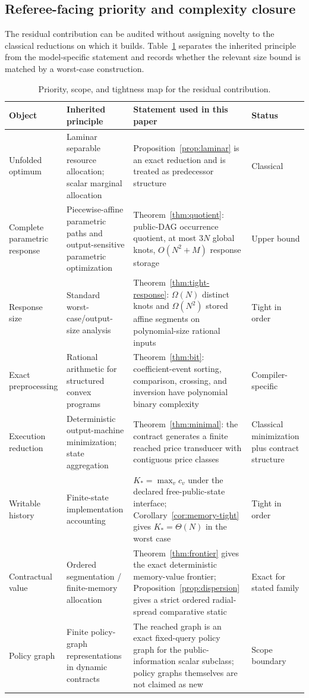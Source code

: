 \subsection{Referee-facing priority and complexity closure}\label{sec:closure-map}
The residual contribution can be audited without assigning novelty to the classical reductions on which it builds. Table~\ref{tab:closure-map} separates the inherited principle from the model-specific statement and records whether the relevant size bound is matched by a worst-case construction.

\begin{table}[t]
\caption{Priority, scope, and tightness map for the residual contribution.}\label{tab:closure-map}
\small
\begin{tabular}{p{}p{}p{}p{}}
\toprule
Object & Inherited principle & Statement used in this paper & Status \\
\midrule
Unfolded optimum & Laminar separable resource allocation; scalar marginal allocation & Proposition~\ref{prop:laminar} is an exact reduction and is treated as predecessor structure & Classical \\
Complete parametric response & Piecewise-affine parametric paths and output-sensitive parametric optimization & Theorem~\ref{thm:quotient}: public-DAG occurrence quotient, at most $3N$ global knots, $O(N^2+M)$ response storage & Upper bound \\
Response size & Standard worst-case/output-size analysis & Theorem~\ref{thm:tight-response}: $\Omega(N)$ distinct knots and $\Omega(N^2)$ stored affine segments on polynomial-size rational inputs & Tight in order \\
Exact preprocessing & Rational arithmetic for structured convex programs & Theorem~\ref{thm:bit}: coefficient-event sorting, comparison, crossing, and inversion have polynomial binary complexity & Compiler-specific \\
Execution reduction & Deterministic output-machine minimization; state aggregation & Theorem~\ref{thm:minimal}: the contract generates a finite reached price transducer with contiguous price classes & Classical minimization plus contract structure \\
Writable history & Finite-state implementation accounting & $K_*=\max_v c_v$ under the declared free-public-state interface; Corollary~\ref{cor:memory-tight} gives $K_*=\Theta(N)$ in the worst case & Tight in order \\
Contractual value & Ordered segmentation / finite-memory allocation & Theorem~\ref{thm:frontier} gives the exact deterministic memory-value frontier; Proposition~\ref{prop:dispersion} gives a strict ordered radial-spread comparative static & Exact for stated family \\
Policy graph & Finite policy-graph representations in dynamic contracts & The reached graph is an exact fixed-query policy graph for the public-information scalar subclass; policy graphs themselves are not claimed as new & Scope boundary \\
\bottomrule
\end{tabular}
\end{table}


